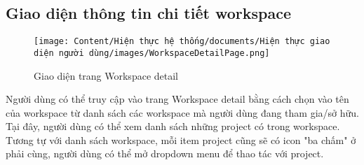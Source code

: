 \subsection{Giao diện thông tin chi tiết workspace}

\begin{figure}[H]
    \centering
    \texttt{[image: Content/Hiện thực hệ thống/documents/Hiện thực giao diện người dùng/images/WorkspaceDetailPage.png]}
    \vspace{0.5cm}
    \caption{Giao diện trang Workspace detail}
    \label{fig: Giao diện trang Workspace detail}
\end{figure}

Người dùng có thể truy cập vào trang Workspace detail bằng cách chọn vào tên của workspace từ danh sách các workspace mà người dùng đang tham gia/sở hữu. Tại đây, người dùng có thể xem danh sách những project có trong workspace. Tương tự với danh sách workspace, mỗi item project cũng sẽ có icon "ba chấm" ở phải cùng, người dùng có thể mở dropdown menu để thao tác với project.